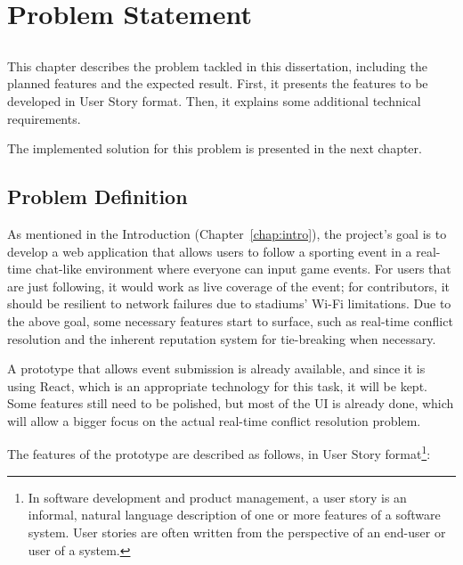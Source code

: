 \chapter{Problem Statement}\label{chap:problem}

\section*{}

This chapter describes the problem tackled in this dissertation, including the planned features and the expected result. First, it presents the features to be developed in User Story format. Then, it explains some additional technical requirements.

The implemented solution for this problem is presented in the next chapter.  

\section{Problem Definition}\label{sec:prob-def}

As mentioned in the Introduction (Chapter~\ref{chap:intro}), the project's goal is to develop a web application that allows users to follow a sporting event in a real-time chat-like environment where everyone can input game events. For users that are just following, it would work as live coverage of the event; for contributors, it should be resilient to network failures due to stadiums' Wi-Fi limitations.
Due to the above goal, some necessary features start to surface, such as real-time conflict resolution and the inherent reputation system for tie-breaking when necessary. 

A prototype that allows event submission is already available, and since it is using React, which is an appropriate technology for this task, it will be kept. Some features still need to be polished, but most of the UI is already done, which will allow a bigger focus on the actual real-time conflict resolution problem.

The features of the prototype are described as follows, in User Story format\footnote{In software development and product management, a user story is an informal, natural language description of one or more features of a software system. User stories are often written from the perspective of an end-user or user of a system.}:

